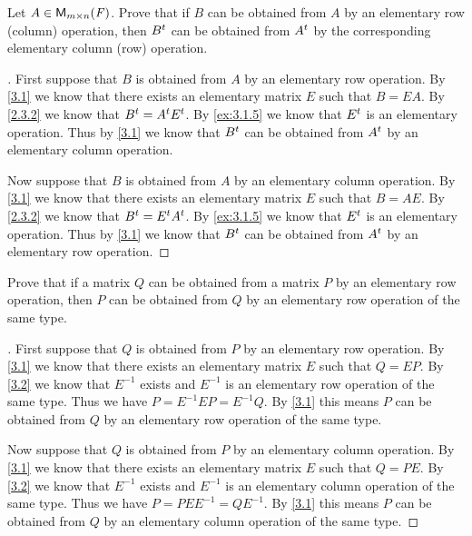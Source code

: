 \begin{ex}\label{ex:3.1.6}
  Let \(A \in \ms\).
  Prove that if \(B\) can be obtained from \(A\) by an elementary row (column) operation, then \({B}^{t}\) can be obtained from \({A}^{t}\) by the corresponding elementary column (row) operation.
\end{ex}

\begin{proof}[]
  First suppose that \(B\) is obtained from \(A\) by an elementary row operation.
  By \cref{3.1} we know that there exists an elementary matrix \(E\) such that \(B = EA\).
  By \cref{2.3.2} we know that \({B}^{t} = {A}^{t} {E}^{t}\).
  By \cref{ex:3.1.5} we know that \({E}^{t}\) is an elementary operation.
  Thus by \cref{3.1} we know that \({B}^{t}\) can be obtained from \({A}^{t}\) by an elementary column operation.

  Now suppose that \(B\) is obtained from \(A\) by an elementary column operation.
  By \cref{3.1} we know that there exists an elementary matrix \(E\) such that \(B = AE\).
  By \cref{2.3.2} we know that \({B}^{t} = {E}^{t} {A}^{t}\).
  By \cref{ex:3.1.5} we know that \({E}^{t}\) is an elementary operation.
  Thus by \cref{3.1} we know that \({B}^{t}\) can be obtained from \({A}^{t}\) by an elementary row operation.
\end{proof}

\setcounter{ex}{7}
\begin{ex}\label{ex:3.1.8}
  Prove that if a matrix \(Q\) can be obtained from a matrix \(P\) by an elementary row operation, then \(P\) can be obtained from \(Q\) by an elementary row operation of the same type.
\end{ex}

\begin{proof}[]
  First suppose that \(Q\) is obtained from \(P\) by an elementary row operation.
  By \cref{3.1} we know that there exists an elementary matrix \(E\) such that \(Q = EP\).
  By \cref{3.2} we know that \(E^{-1}\) exists and \(E^{-1}\) is an elementary row operation of the same type.
  Thus we have \(P = E^{-1} E P = E^{-1} Q\).
  By \cref{3.1} this means \(P\) can be obtained from \(Q\) by an elementary row operation of the same type.

  Now suppose that \(Q\) is obtained from \(P\) by an elementary column operation.
  By \cref{3.1} we know that there exists an elementary matrix \(E\) such that \(Q = PE\).
  By \cref{3.2} we know that \(E^{-1}\) exists and \(E^{-1}\) is an elementary column operation of the same type.
  Thus we have \(P = P E E^{-1} = Q E^{-1}\).
  By \cref{3.1} this means \(P\) can be obtained from \(Q\) by an elementary column operation of the same type.
\end{proof}


